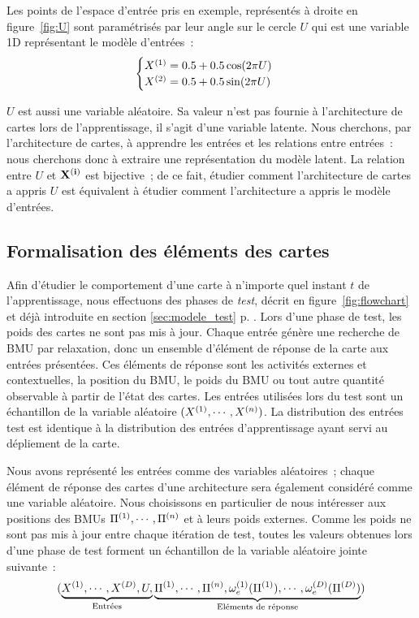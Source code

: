 \documentclass[../main]{subfiles}
\begin{document}
Les points de l'espace d'entrée pris en exemple, représentés à droite en figure~\ref{fig:U} sont paramétrisés par leur angle sur le cercle $U$ qui est une variable 1D représentant le modèle d'entrées~:
\begin{equation}
 \begin{cases}
     X^{({1})}= 0.5 + 0.5  \cos(2\pi U)\\
     X^{({2})} = 0.5 + 0.5 \sin(2 \pi U)
    \end{cases}\,
\end{equation}

$U$ est aussi une variable aléatoire. Sa valeur n'est pas fournie à l'architecture de cartes lors de l'apprentissage, il s'agit d'une variable latente.
Nous cherchons, par l'architecture de cartes, à apprendre les entrées et les relations entre entrées~: nous cherchons donc à extraire une représentation du modèle latent. La relation entre $U$ et $\mathbf{X^{({i})}}$ est bijective~; de ce fait, étudier comment l'architecture de cartes a appris $U$ est équivalent à étudier comment l'architecture a appris le modèle d'entrées.

\subsection{Formalisation des éléments des cartes}

Afin d'étudier le comportement d'une carte à n'importe quel instant $t$ de l'apprentissage, nous effectuons des phases de \emph{test}, décrit en figure~\ref{fig:flowchart} et déjà introduite en section \ref{sec:modele_test} p. \pageref{sec:modele_test}.
Lors d'une phase de test, les poids des cartes ne sont pas mis à jour. Chaque entrée génère une recherche de BMU par relaxation, donc un ensemble d'élément de réponse de la carte aux entrées présentées. Ces éléments de réponse sont les activités externes et contextuelles, la position du BMU, le poids du BMU ou tout autre quantité observable à partir de l'état des cartes.
Les entrées utilisées lors du test sont un échantillon de la variable aléatoire $(X^{({1})}, \cdots, X^{({n})})$.
La distribution des entrées test est identique à la distribution des entrées d'apprentissage ayant servi au dépliement de la carte.

Nous avons représenté les entrées comme des variables aléatoires~; chaque élément de réponse des cartes d'une architecture sera également considéré comme une variable aléatoire.
Nous choisissons en particulier de nous intéresser aux positions des BMUs $\Pi^{({1})}, \cdots, \Pi^{({n})}$ et à leurs poids externes.
Comme les poids ne sont pas mis à jour entre chaque itération de test, toutes les valeurs obtenues lors d'une phase de test forment un échantillon de la variable aléatoire jointe suivante~:
$$(\underbrace{X^{({1})}, \cdots, X^{({D})}, U,}_{\text{Entrées}} \underbrace{\Pi^{({1})}, \cdots, \Pi^{({n})}, \omega_e^{({1})}(\Pi^{({1})}), \cdots, \omega_e^{({D})}(\Pi^{({D})})}_{\text{Eléments de réponse}})$$
\end{document}
